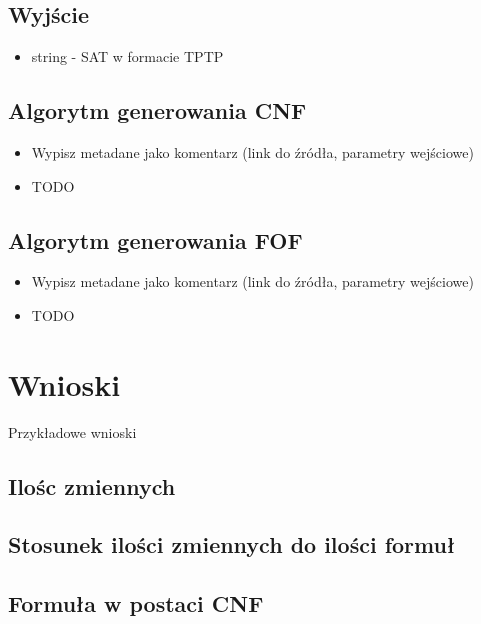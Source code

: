 \documentclass[a4paper,12pt]{article}
\begin{document}
\subsection{Wyjście}

\begin{itemize}
  \item string - SAT w formacie TPTP
\end{itemize}

\subsection{Algorytm generowania CNF}
\begin{itemize}
  \item Wypisz metadane jako komentarz (link do źródła, parametry wejściowe)
  \item TODO
\end{itemize}

\subsection{Algorytm generowania FOF}
\begin{itemize}
  \item Wypisz metadane jako komentarz (link do źródła, parametry wejściowe)
  \item TODO
\end{itemize}

\section{Wnioski}

Przykładowe wnioski

\subsection{Ilośc zmiennych}

\subsection{Stosunek ilości zmiennych do ilości formuł}

\subsection{Formuła w postaci CNF}

\printglossary[type=\acronymtype]
\printglossary
\end{document}
